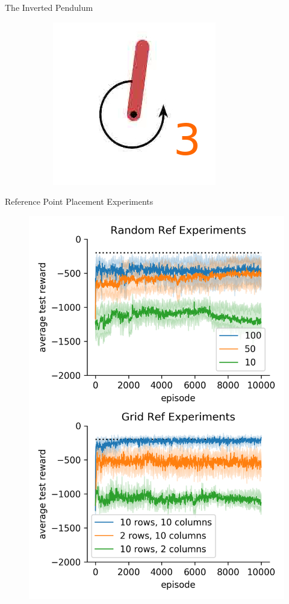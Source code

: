 \documentclass{beamer}
\begin{document}
\begin{frame}{The Inverted Pendulum}
\begin{figure}
\begin{subfigure}{0.2\linewidth}
    \end{subfigure}
    \begin{subfigure}{0.2\linewidth}
      \centering
      \includegraphics[width=\linewidth,trim=0 0 0 20]{assets/pendulum_traj_3}
    \end{subfigure}
  \end{figure}
\end{frame}

\begin{frame}{Reference Point Placement Experiments}
  \begin{figure}[htb]
      \centering
      \includegraphics[width=0.5\linewidth,trim=0 0 0 0,clip]{assets/combined_ref_exps}
  \end{figure}
\end{frame}
\end{document}
